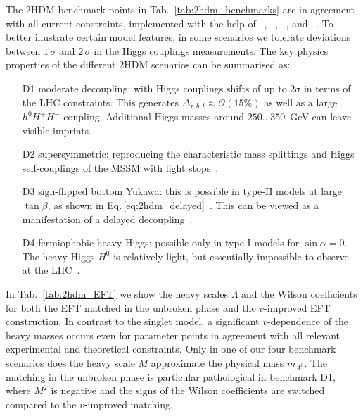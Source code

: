 The 2HDM benchmark points in Tab.~\ref{tab:2hdm_benchmarks} are in
agreement with all current constraints, implemented with the help of
~\cite{2hdmc},
~\cite{higgsbounds},
~\cite{superiso}, and
~\cite{higgssignals}. To better illustrate
certain model features, in some scenarios we tolerate deviations
between $1\,\sigma$ and $2\,\sigma$ in the Higgs couplings
measurements.  The key physics properties of the different 2HDM
scenarios can be summarised as:
%
\begin{itemize}
\item[D1] moderate decoupling: with Higgs couplings shifts of up to
$2\sigma$ in terms of the LHC constraints.  This generates
$\Delta_{\tau,b,t} \approx \mathcal{O}(15\%)$ as well as a large $h^0
H^+ H^-$ coupling. Additional Higgs masses around $250\dots350$~GeV
can leave visible imprints.
\item[D2] supersymmetric: reproducing the characteristic mass
splittings and Higgs self-couplings of the MSSM with light
stops~\cite{Carena:2013qia}.
\item[D3] sign-flipped bottom Yukawa: this is possible in type-II
models at large $\tan\beta$, as shown in
Eq.\,\eqref{eq:2hdm_delayed}~\cite{Ferreira:2014naa}. This can be
viewed as a manifestation of a delayed decoupling~\cite{Haber:2000kq}.
\item[D4] fermiophobic heavy Higgs: possible only in type-I models for
$\sin\alpha =0$. The heavy Higgs $H^0$ is relatively light, but
essentially impossible to observe at the LHC~\cite{Hespel:2014sla,
fermiophobic}.
\end{itemize}
%
In Tab.~\ref{tab:2hdm_EFT} we show the heavy scales $\Lambda$ and the
Wilson coefficients for both the EFT matched in the unbroken phase and
the $v$-improved EFT construction. In contrast to the singlet model, a
significant $v$-dependence of the heavy masses occurs even for
parameter points in agreement with all relevant experimental and
theoretical constraints. Only in one of our four benchmark scenarios
does the heavy scale $M$ approximate the physical mass $m_{A^0}$. The
matching in the unbroken phase is particular pathological in benchmark
D1, where $M^2$ is negative and the signs of the Wilson coefficients
are switched compared to the $v$-improved matching.

